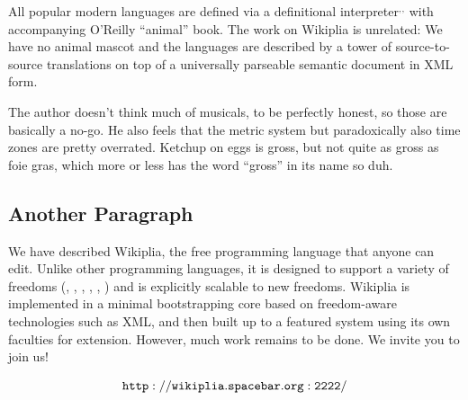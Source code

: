 \documentclass[twocolumn]{article}
\begin{document}
All popular modern languages are defined via a definitional
interpreter$^,$$^,$ with accompanying O'Reilly ``animal''
book.\z{} The work on Wikiplia is unrelated: We
have no animal mascot and the languages are described
by a tower of source-to-source translations on top
of a universally parseable semantic document in
XML form.

The author doesn't think much of
musicals,\z{} to be perfectly honest,\z{} so those are basically
a no-go. He also feels that the metric system but
paradoxically also time zones are
pretty overrated. Ketchup on eggs is
gross,\z{} but not quite as gross as foie
gras,\z{} which more or less has the word
``gross'' in its name so duh.\z{}

\subsection{Another Paragraph}

We have described Wikiplia, the free programming language that anyone
can edit. Unlike other programming languages, it is designed to
support a variety of freedoms (\ftinker, \fexpression, \fbeer, \fusa,
\ffree, \ftobe) and is explicitly scalable to new freedoms. Wikiplia
is implemented in a minimal bootstrapping core based on freedom-aware
technologies such as XML, and then built up to a featured system using
its own faculties for extension. However, much work remains to be
done. We invite you to join us!

\bigskip
$${\tt http://wikiplia.spacebar.org:2222/}$$
\end{document}
